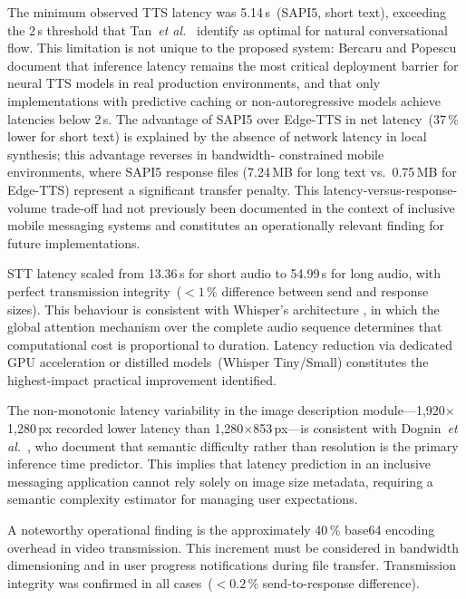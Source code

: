 \documentclass[journal]{IEEEtran}
\begin{document}
	The minimum observed TTS latency was 5.14\,s~(SAPI5, short
	text), exceeding the 2\,s threshold that
	Tan~\textit{et al.}~\cite{tan2021} identify as optimal for
	natural conversational flow.
	This limitation is not unique to the proposed system:
	Bercaru and Popescu~\cite{bercaru2024} document that inference
	latency remains the most critical deployment barrier for
	neural TTS models in real production environments, and that only
	implementations with predictive caching or non-autoregressive
	models achieve latencies below 2\,s.
	The advantage of SAPI5 over Edge-TTS in net latency~(37\,\%
	lower for short text) is explained by the absence of network
	latency in local synthesis; this advantage reverses in bandwidth-
	constrained mobile environments, where SAPI5 response files
	(7.24\,MB for long text vs.\ 0.75\,MB for Edge-TTS) represent
	a significant transfer penalty.
	This latency-versus-response-volume trade-off had not
	previously been documented in the context of inclusive mobile
	messaging systems and constitutes an operationally relevant
	finding for future implementations.
	
	STT latency scaled from 13.36\,s for short audio to 54.99\,s
	for long audio, with perfect transmission integrity~($<1\,\%$
	difference between send and response sizes).
	This behaviour is consistent with Whisper's architecture
	\cite{radford2023}, in which the global attention mechanism
	over the complete audio sequence determines that computational
	cost is proportional to duration.
	Latency reduction via dedicated GPU acceleration or distilled
	models~(Whisper Tiny/Small) constitutes the highest-impact
	practical improvement identified.
	
	The non-monotonic latency variability in the image description
	module---1{,}920$\times$1{,}280\,px recorded lower latency
	than 1{,}280$\times$853\,px---is consistent with
	Dognin~\textit{et al.}~\cite{dognin2021}, who document that
	semantic difficulty rather than resolution is the primary
	inference time predictor.
	This implies that latency prediction in an inclusive messaging
	application cannot rely solely on image size metadata,
	requiring a semantic complexity estimator for managing user
	expectations.
	
	A noteworthy operational finding is the approximately 40\,\%
	base64 encoding overhead in video transmission.
	This increment must be considered in bandwidth dimensioning
	and in user progress notifications during file transfer.
	Transmission integrity was confirmed in all cases~($<0.2\,\%$
	send-to-response difference).
	
\end{document}
